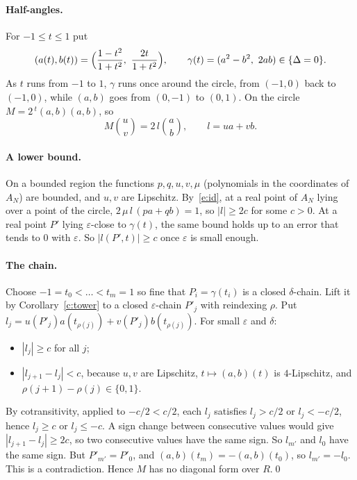 \documentclass[11pt]{article}
\newcommand{\R}{\mathbb{R}}
\numberwithin{equation}{section}
\theoremstyle{plain}
\theoremstyle{definition}
\theoremstyle{remark}
\newtheorem*{comment}{Comment}
\begin{document}
\paragraph{Half-angles.} For $-1\le t\le1$ put
\[
(a(t),b(t))=\Bigl(\frac{1-t^2}{1+t^2},\ \frac{2t}{1+t^2}\Bigr),\qquad
\gamma(t)=(a^2-b^2,\ 2ab)\in\{\Delta=0\}.
\]
As $t$ runs from $-1$ to $1$, $\gamma$ runs once around the circle, from $(-1,0)$ back to $(-1,0)$,
while $(a,b)$ goes from $(0,-1)$ to $(0,1)$. On the circle $M=2\,{}^t(a,b)(a,b)$, so
\[
M\binom uv=2\,l\binom ab,\qquad l=ua+vb .
\]

\paragraph{A lower bound.} On a bounded region the functions $p,q,u,v,\mu$ (polynomials in the
coordinates of $A_N$) are bounded, and $u,v$ are Lipschitz. By~\eqref{e:id}, at a real point of
$A_N$ lying over a point of the circle, $2\,\mu\,l\,(pa+qb)=1$, so $|l|\ge 2c$ for some $c>0$. At a
real point $P'$ lying $\varepsilon$-close to $\gamma(t)$, the same bound holds up to an error that
tends to $0$ with $\varepsilon$. So $|l(P',t)|\ge c$ once $\varepsilon$ is small enough.

\paragraph{The chain.} Choose $-1=t_0<\dots<t_m=1$ so fine that $P_i=\gamma(t_i)$ is a closed
$\delta$-chain. Lift it by Corollary~\ref{c:tower} to a closed $\varepsilon$-chain $P'_j$ with
reindexing $\rho$. Put $l_j=u(P'_j)a(t_{\rho(j)})+v(P'_j)b(t_{\rho(j)})$. For small $\varepsilon$
and $\delta$:
\begin{itemize}
\item $|l_j|\ge c$ for all $j$;
\item $|l_{j+1}-l_j|<c$, because $u,v$ are Lipschitz, $t\mapsto(a,b)(t)$ is $4$-Lipschitz, and
  $\rho(j+1)-\rho(j)\in\{0,1\}$.
\end{itemize}
By cotransitivity, applied to $-c/2<c/2$, each $l_j$ satisfies $l_j>c/2$ or $l_j<-c/2$, hence
$l_j\ge c$ or $l_j\le-c$. A sign change between consecutive values would give
$|l_{j+1}-l_j|\ge2c$, so two consecutive values have the same sign. So $l_{m'}$ and $l_0$ have the same sign. But $P'_{m'}=P'_0$, and
$(a,b)(t_m)=-(a,b)(t_0)$, so $l_{m'}=-l_0$. This is a contradiction. Hence $M$ has no diagonal form
over $R$.\qed

\end{document}
